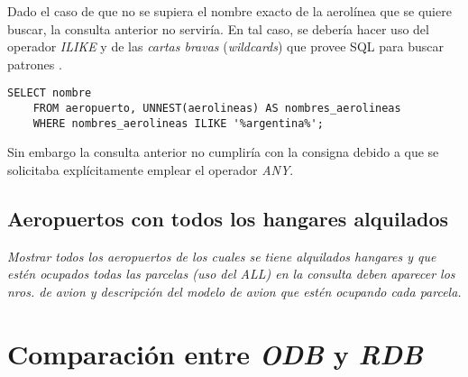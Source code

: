 Dado el caso de que no se supiera el nombre exacto de la aerolínea que se quiere buscar, la consulta anterior no serviría. En tal caso, se debería hacer uso del operador \emph{ILIKE} y de las \emph{cartas bravas} (\emph{wildcards}) que provee SQL para buscar patrones \cite{pattern}.

\vspace*{5mm}
\lstset{style=sql}
\begin{lstlisting}
SELECT nombre
    FROM aeropuerto, UNNEST(aerolineas) AS nombres_aerolineas 
    WHERE nombres_aerolineas ILIKE '%argentina%';
\end{lstlisting}

Sin embargo la consulta anterior no cumpliría con la consigna debido a que se solicitaba explícitamente emplear el operador \emph{ANY}.

\subsection{Aeropuertos con todos los hangares alquilados}

\emph{Mostrar todos los aeropuertos de los cuales se tiene alquilados hangares y que estén ocupados todas las parcelas (uso del ALL) en la consulta deben aparecer los nros. de avion y descripción del modelo de avion que estén ocupando cada parcela.} 



\section{Comparación entre \emph{ODB} y \emph{RDB}}





\clearpage




